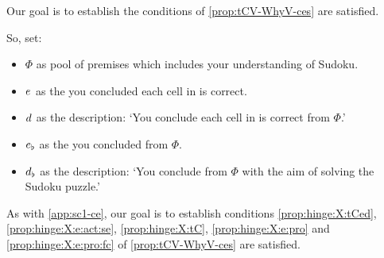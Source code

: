 \begin{note}
\begin{scenario}
\begin{figure}[h!]
\begin{subfigure}{.45\linewidth}
        \caption{\sudokuPuzR{}}
      \end{subfigure}
    \end{figure}
    \vspace{-\baselineskip}
  \end{scenario}
\end{note}


\begin{note}
  Our goal is to establish the conditions of \autoref{prop:tCV-WhyV-ces} are satisfied.

  So, set:
  \begin{itemize}
  \item
    \(\Phi\) as pool of premises which includes your understanding of Sudoku.
  \item
    \(e\sb{}\) as the  you concluded each cell in \sudokuPuzL{} is correct.
  \item
    \(d\sb{}\) as the description: `You conclude each cell in \sudokuPuzL{} is correct from \(\Phi\).'
  \item
    \(e\sb{\flat}\) as the  you concluded \sudokuLPV{} from \(\Phi\).
  \item
    \(d\sb{\flat}\) as the description: `You conclude \sudokuLPV{} from \(\Phi\) with the aim of solving the Sudoku puzzle.'
  \end{itemize}
\end{note}

\begin{note}
  As with \autoref{app:sc1-ce}, our goal is to establish conditions \ref{prop:hinge:X:tCed}, \ref{prop:hinge:X:e:act:se}, \ref{prop:hinge:X:tC}, \ref{prop:hinge:X:e:pro} and \ref{prop:hinge:X:e:pro:fc} of \autoref{prop:tCV-WhyV-ces} are satisfied.
\end{note}

